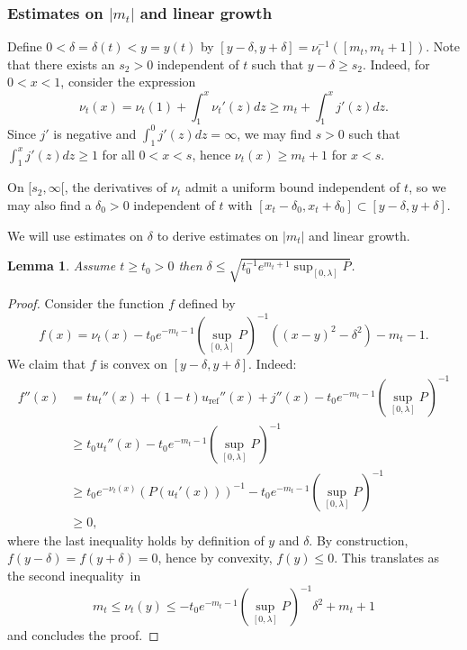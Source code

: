 \documentclass[10pt]{amsart}
\theoremstyle{plain}
\newtheorem{lem}[thm]{Lemma}
\theoremstyle{definition}
\begin{document}
\subsubsection{Estimates on $|m_t|$ and linear growth}

Define $0<\delta=\delta(t)<y=y(t)$ by $[y-\delta,y+\delta]=\nu_t^{-1}([m_t,m_t+1])$.
Note that there exists an $s_2>0$ independent of $t$ such that $y-\delta\geq s_2$.
Indeed, for $0<x<1$, consider the expression
\[ \nu_t(x) = \nu_t(1) + \int_1^x\nu_t'(z)dz \geq m_t+\int_1^x j'(z)dz. \]
Since $j'$ is negative and $\int_1^0 j'(z)dz=\infty$,
we may find $s>0$ such that $\int_1^x j'(z)dz\geq 1$ for all
$0<x<s$, hence $\nu_t(x)\geq m_t+1$ for $x<s$.

On $[s_2,\infty[$, the derivatives of $\nu_t$ admit a uniform bound independent
of $t$, so we may also find a $\delta_0>0$ independent of $t$ with
$[x_t-\delta_0,x_t+\delta_0]\subset [y-\delta,y+\delta]$.

We will use estimates on $\delta$ to derive estimates on $|m_t|$ and linear growth.

\begin{lem}
\label{lem_estimate_delta}
Assume $t\geq t_0>0$ then $\delta \leq \sqrt{t_0^{-1}e^{m_t+1}\sup_{[0,\lambda]}P}$.
\end{lem}

\begin{proof}
Consider the function $f$ defined by
\begin{equation*}
f(x)=\nu_t(x)-t_0e^{-m_t-1}(\sup_{[0,\lambda]}P)^{-1}\left((x-y)^2-\delta^2\right)-m_t-1.
\end{equation*}
We claim that $f$ is convex on $[y-\delta,y+\delta]$. Indeed:
\begin{align*}
f''(x)&=tu_t''(x)+(1-t)u_{\mathrm{ref}}''(x)+j''(x)-t_0e^{-m_t-1}(\sup_{[0,\lambda]}P)^{-1} \\
&\geq t_0u_t''(x)-t_0e^{-m_t-1}(\sup_{[0,\lambda]}P)^{-1} \\
&\geq t_0e^{-\nu_t(x)}(P(u_t'(x)))^{-1}-t_0e^{-m_t-1}(\sup_{[0,\lambda]}P)^{-1} \\
&\geq 0,
\end{align*}
where the last inequality holds by definition of $y$ and $\delta$.
By construction, $f(y-\delta)=f(y+\delta)=0$, hence by convexity, $f(y)\leq 0$.
This translates as the second inequality~in
\begin{equation*}
m_t\leq\nu_t(y)\leq -t_0e^{-m_t-1}(\sup_{[0,\lambda]}P)^{-1}\delta^2+m_t+1
\end{equation*}
and concludes the proof.
\end{proof}
\end{document}

